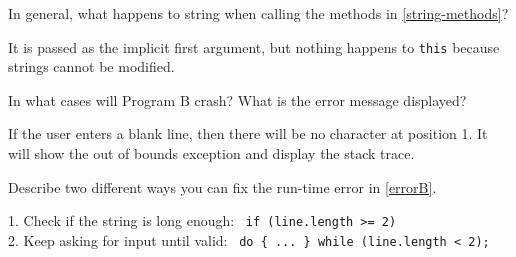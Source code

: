 \Q In general, what happens to  string when calling the methods in \ref{string-methods}?

\begin{answer}
It is passed as the implicit first argument, but nothing happens to {\tt this} because strings cannot be modified.
\end{answer}


\Q \label{errorB} In what cases will Program B crash? What is the error message displayed?

\begin{answer}
If the user enters a blank line, then there will be no character at position 1. It will show the out of bounds exception and display the stack trace.
\end{answer}


\Q Describe two different ways you can fix the run-time error in \ref{errorB}.

\begin{answer}[3em]
1. Check if the string is long enough: ~{\tt if (line.length >= 2)} \\
2. Keep asking for input until valid: ~{\tt do \{~...~\} while (line.length < 2);}
\end{answer}
